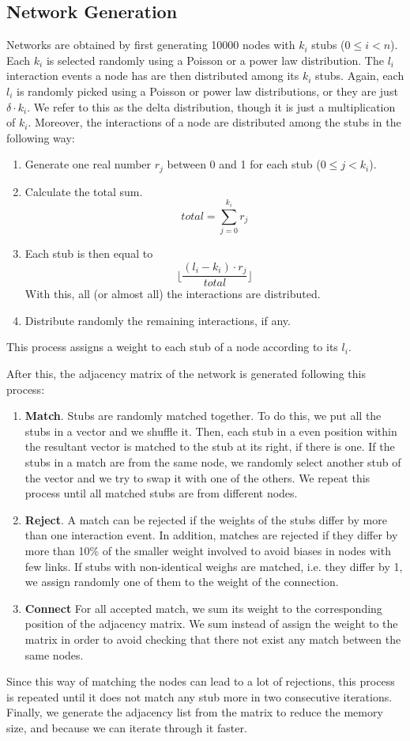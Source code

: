\subsection{Network Generation}
Networks are obtained by first generating 10000 nodes with $k_i$ stubs ($0 \leq i < n$). Each $k_i$ is selected randomly using a Poisson or a power law distribution. The $l_i$ interaction events a node has are then distributed among its $k_i$ stubs. Again, each $l_i$ is randomly picked using a Poisson or power law distributions, or they are just $\delta \cdot k_i$. We refer to this as the delta distribution, though it is just a multiplication of $k_i$. Moreover, the interactions of a node are distributed among the stubs in the following way:
\begin{enumerate}
    \item Generate one real number $r_j$ between 0 and 1 for each stub ($0 \leq j < k_i$).
    \item Calculate the total sum. $$total = \sum_{j=0}^{k_i}r_j$$
    \item Each stub is then equal to $$\lfloor \frac{(l_i-k_i)\cdot r_j}{total}\rfloor$$
    With this, all (or almost all) the interactions are distributed.
    \item Distribute randomly the remaining interactions, if any.
\end{enumerate}
This process assigns a weight to each stub of a node according to its $l_i$.

After this, the adjacency matrix of the network is generated following this process:
\begin{enumerate}
    \item \textbf{Match}. Stubs are randomly matched together. To do this, we put all the stubs in a vector and we shuffle it. Then, each stub in a even position within the resultant vector is matched to the stub at its right, if there is one. If the stubs in a match are from the same node, we randomly select another stub of the vector and we try to swap it with one of the others. We repeat this process until all matched stubs are from different nodes.
    \item \textbf{Reject}. A match can be rejected if the weights of the stubs differ by more than one interaction event. In addition, matches are rejected if they differ by more than 10\% of the smaller weight involved to avoid biases in nodes with few links. If stubs with non-identical weighs are matched, i.e. they differ by 1, we assign randomly one of them to the weight of the connection.
    \item \textbf{Connect} For all accepted match, we sum its weight to the corresponding position of the adjacency matrix. We sum instead of assign the weight to the matrix in order to avoid checking that there not exist any match between the same nodes.
\end{enumerate}
Since this way of matching the nodes can lead to a lot of rejections, this process is repeated until it does not match any stub more in two consecutive iterations. Finally, we generate the adjacency list from the matrix to reduce the memory size, and because we can iterate through it faster.

